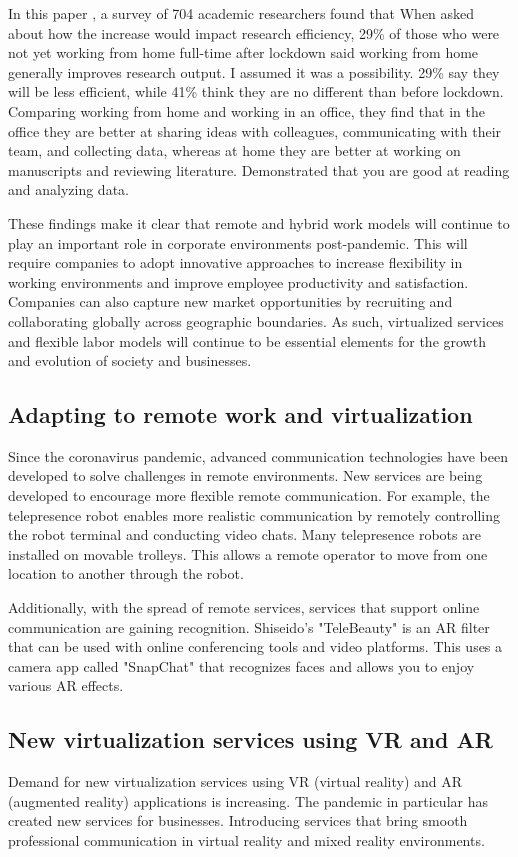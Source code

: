 \documentclass[12pt]{article}
\begin{document}
In this paper \cite{ref18}, a survey of 704 academic researchers found that
When asked about how the increase
would impact research efficiency, 29\% of those who were not yet working from
home full-time after lockdown said working from home generally improves
research output. I assumed it was a possibility. 29\% say they will be less
efficient, while 41\% think they are no different than before lockdown.
Comparing working from home and working in an office, they find that in the
office they are better at sharing ideas with colleagues, communicating with
their team, and collecting data, whereas at home they are better at working on
manuscripts and reviewing literature. Demonstrated that you are good at reading
and analyzing data.

These findings make it clear that remote and hybrid work models will continue
to play an important role in corporate environments post-pandemic. This will
require companies to adopt innovative approaches to increase flexibility in
working environments and improve employee productivity and satisfaction.
Companies can also capture new market opportunities by recruiting and
collaborating globally across geographic boundaries. As such, virtualized
services and flexible labor models will continue to be essential elements for
the growth and evolution of society and businesses.

\subsection{Adapting to remote work and virtualization}
Since the coronavirus pandemic, advanced communication technologies have been
developed to solve challenges in remote environments. New services are being
developed to encourage more flexible remote communication. For example, the
telepresence robot \cite{ref19}
enables more realistic communication by remotely controlling the robot terminal
and conducting video chats. Many telepresence robots are installed on movable
trolleys. This allows a remote operator to move from one location to another
through the robot.

Additionally, with the spread of remote services, services that support online
communication are gaining recognition. Shiseido's "TeleBeauty" \cite{ref20} is
an AR filter that can
be used with online conferencing tools and video platforms. This uses a camera
app called "SnapChat" that recognizes faces and allows you to enjoy various AR
effects.

\subsection{New virtualization services using VR and AR}
Demand for new virtualization services using VR (virtual reality) and AR
(augmented reality) applications is increasing. The pandemic in particular has
created new services for businesses. Introducing services that bring smooth
professional communication in virtual reality and mixed reality environments.
\end{document}
